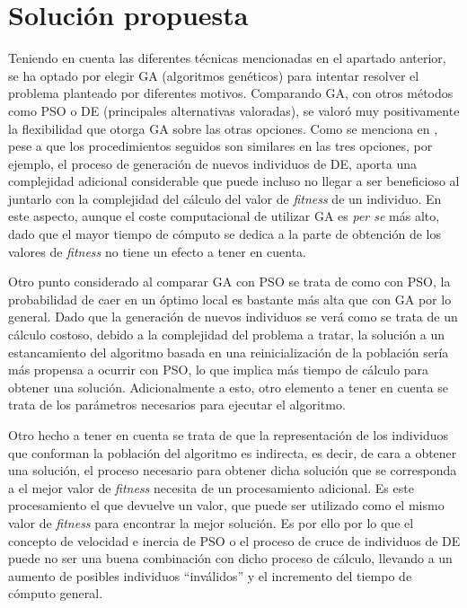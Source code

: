 \documentclass[11pt,spanish,listoffigures,listoftables]{tfgetsinf}
\begin{document}
\section{Solución propuesta}
Teniendo en cuenta las diferentes técnicas mencionadas en el apartado anterior, se ha optado por elegir GA (algoritmos genéticos) para intentar resolver el problema planteado por diferentes motivos. Comparando GA, con otros métodos como PSO o DE (principales alternativas valoradas), se valoró muy positivamente la flexibilidad que otorga GA sobre las otras opciones. Como se menciona en \cite{KACHI2012}, pese a que los procedimientos seguidos son similares en las tres opciones, por ejemplo, el proceso de generación de nuevos individuos de DE, aporta una complejidad adicional considerable que puede incluso no llegar a ser beneficioso al juntarlo con la complejidad del cálculo del valor de \textit{fitness} de un individuo. En este aspecto, aunque el coste computacional de utilizar GA es \textit{per se} más alto, dado que el mayor tiempo de cómputo se dedica a la parte de obtención de los valores de \textit{fitness} no tiene un efecto a tener en cuenta.

Otro punto considerado al comparar GA con PSO se trata de como con PSO, la probabilidad de caer en un óptimo local es bastante más alta que con GA por lo general. Dado que la generación de nuevos individuos se verá como se trata de un cálculo costoso, debido a la complejidad del problema a tratar, la solución a un estancamiento del algoritmo basada en una reinicialización de la población sería más propensa a ocurrir con PSO, lo que implica más tiempo de cálculo para obtener una solución. Adicionalmente a esto, otro elemento a tener en cuenta se trata de los parámetros necesarios para ejecutar el algoritmo.

Otro hecho a tener en cuenta se trata de que la representación de los individuos que conforman la población del algoritmo es indirecta, es decir, de cara a obtener una solución, el proceso necesario para obtener dicha solución que se corresponda a el mejor valor de \textit{fitness} necesita de un procesamiento adicional. Es este procesamiento el que devuelve un valor, que puede ser utilizado como el mismo valor de \textit{fitness} para encontrar la mejor solución. Es por ello por lo que el concepto de velocidad e inercia de PSO o el proceso de cruce de individuos de DE puede no ser una buena combinación con dicho proceso de cálculo, llevando a un aumento de posibles individuos ``inválidos'' y el incremento del tiempo de cómputo general.
\end{document}
